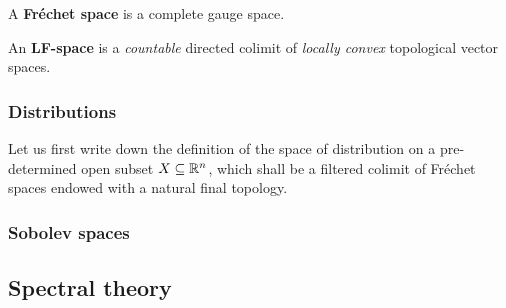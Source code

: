             \begin{definition} \label{def: frechet_spaces}
                A \textbf{Fr\'echet space} is a complete gauge space.
            \end{definition}
            
            \begin{definition}[LF-spaces] \label{def: LF_spaces}
                An \textbf{LF-space} is a \textit{countable} directed colimit of \textit{locally convex} topological vector spaces.
            \end{definition}
            
        \subsubsection{Distributions}
            Let us first write down the definition of the space of distribution on a pre-determined open subset $X \subseteq \mathbb{R}^n$, which shall be a filtered colimit of Fr\'echet spaces endowed with a natural final topology.
            \begin{definition}[Distributions] \label{def: distributions}
                
            \end{definition}
    
        \subsubsection{Sobolev spaces}
        
    \subsection{Spectral theory}